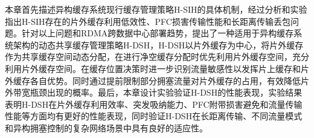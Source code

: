 \label{c4:s6:brief summary}

本章首先描述异构缓存系统现行缓存管理策略H-SIH的具体机制，经过分析和实验指出H-SIH存在的片外缓存利用低效性、PFC损害传输性能和长距离传输丢包问题。针对以上问题和RDMA跨数据中心部署趋势，提出了一种适用于异构缓存系统架构的动态共享缓存管理策略H-DSH，H-DSH以片外缓存为中心，将片外缓存作为共享缓存空间动态分配，在进行净空缓存分配时优先利用片外缓存空间，充分利用片外缓存空间。在缓存位置决策时进一步识别流量敏感性以发挥片上缓存和片外缓存各自优势。同时通过提前限制部分拥塞流量对片外缓存的占用，有效降低片外带宽瓶颈出现的概率。最后，本章设计实验验证H-DSH的性能表现，实验结果表明H-DSH在片外缓存利用效率、突发吸纳能力、PFC附带损害避免和流量传输性能等方面均有更好的性能表现，同时验证H-DSH在长距离传输、不同流量模式和异构拥塞控制的复杂网络场景中具有良好的适应性。

\clearpage